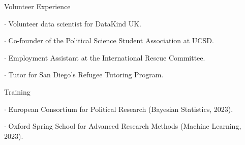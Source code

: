 \documentclass[10pt]{resume} %
\begin{document}
	\begin{rSection}{Volunteer Experience} \itemsep -5pt
		\item $\cdot$ Volunteer data scientist for DataKind UK.
		\item $\cdot$ Co-founder of the Political Science Student Association at UCSD.
		\item $\cdot$ Employment Assistant at the International Rescue Committee.
		\item $\cdot$ Tutor for San Diego's Refugee Tutoring Program.
	\end{rSection}

	\begin{rSection}{Training} \itemsep -5pt
		
		\item $\cdot$ European Consortium for Political Research (Bayesian Statistics, 2023).
		
		\item $\cdot$ Oxford Spring School for Advanced Research Methods (Machine Learning, 2023).
	
	\end{rSection}
\end{document}
